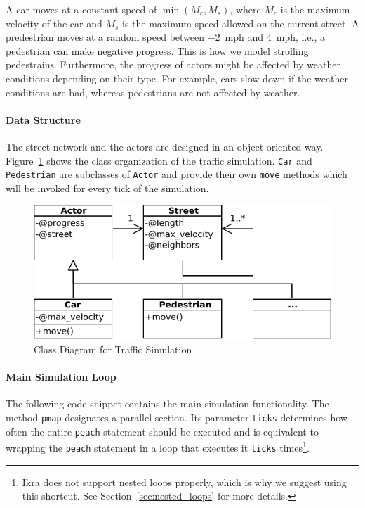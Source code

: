 \documentclass[preprint]{sigplanconf}
\begin{document}
A car moves at a constant speed of $\min(M_c, M_s)$, where $M_c$ is the maximum velocity of the car and $M_s$ is the maximum speed allowed on the current street. A predestrian moves at a random speed between $-2$~mph and $4$~mph, i.e., a pedestrian can make negative progress. This is how we model strolling pedestrains. Furthermore, the progress of actors might be affected by weather conditions depending on their type. For example, cars slow down if the weather conditions are bad, whereas pedestrians are not affected by weather.

\paragraph{Data Structure}
The street network and the actors are designed in an object-oriented way. Figure~\ref{fig:running_example_classes} shows the class organization of the traffic simulation. \texttt{Car} and \texttt{Pedestrian} are subclasses of \texttt{Actor} and provide their own \texttt{move} methods which will be invoked for every tick of the simulation. 

\begin{figure}[!htp]
    \centering
    \includegraphics[width=0.8\columnwidth]{class_diagram_running_ex.pdf}
    \caption{Class Diagram for Traffic Simulation}
    \label{fig:running_example_classes}
\end{figure}

\paragraph{Main Simulation Loop}
The following code snippet contains the main simulation functionality. The method \texttt{pmap} designates a parallel section. Its parameter \texttt{ticks} determines how often the entire \texttt{peach} statement should be executed and is equivalent to wrapping the \texttt{peach} statement in a loop that executes it \texttt{ticks} times\footnote{Ikra does not support nested loops properly, which is why we suggest using this shortcut. See Section~\ref{sec:nested_loops} for more details.}.
\end{document}
